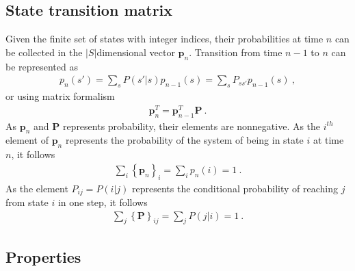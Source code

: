 \documentclass[letterpaper,10pt,english]{jupyterBook}
\begin{document}
\subsection{State transition matrix}
\label{\detokenize{ch/statistical-mechanics/markov-process-notes:state-transition-matrix}}\label{\detokenize{ch/statistical-mechanics/markov-process-notes:statistical-mechanics-markov-process-transition-matrix}}
\sphinxAtStartPar
Given the finite set of states with integer indices, their probabilities at time \(n\) can be collected in the \(|S|\)\sphinxhyphen{}dimensional vector \(\mathbf{p}_n\). Transition from time \(n-1\) to \(n\) can be represented as
\begin{equation*}
\begin{split}p_n(s') = \sum_s P (s'|s) p_{n-1}(s) = \sum_s P_{ss'} p_{n-1}(s)  \ ,\end{split}
\end{equation*}
\sphinxAtStartPar
or using matrix formalism
\begin{equation*}
\begin{split}\mathbf{p}^T_{n} = \mathbf{p}^T_{n-1} \mathbf{P} \ .\end{split}
\end{equation*}
\sphinxAtStartPar
As \(\mathbf{p}_n\) and \(\mathbf{P}\) represents probability, their elements are non\sphinxhyphen{}negative. As the \(i^{th}\) element of \(\mathbf{p}_n\) represents the probability of the system of being in state \(i\) at time \(n\), it follows
\begin{equation*}
\begin{split}\sum_i \left\{ \mathbf{p}_n \right\}_i = \sum_i p_n(i) = 1 \ .\end{split}
\end{equation*}
\sphinxAtStartPar
As the element \(P_{ij} = P(i|j)\) represents the conditional probability of reaching \(j\) from state \(i\) in one step, it follows
\begin{equation*}
\begin{split}\sum_{j} \left\{ \mathbf{P} \right\}_{ij} = \sum_j P(j|i) = 1 \ .\end{split}
\end{equation*}

\subsection{Properties}
\label{\detokenize{ch/statistical-mechanics/markov-process-notes:properties}}\label{\detokenize{ch/statistical-mechanics/markov-process-notes:statistical-mechanics-markov-process-properties}}
\end{document}
